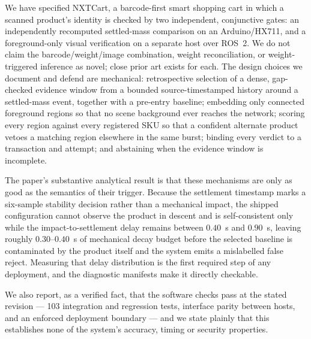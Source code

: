 \documentclass[conference]{IEEEtran}
\begin{document}
We have specified NXTCart, a barcode-first smart shopping cart in which a scanned product's identity
is checked by two independent, conjunctive gates: an independently recomputed settled-mass comparison
on an Arduino/HX711, and a foreground-only visual verification on a separate host over ROS~2. We do
not claim the barcode/weight/image combination, weight reconciliation, or weight-triggered inference
as novel; close prior art exists for each. The design choices we document and defend are mechanical:
retrospective selection of a dense, gap-checked evidence window from a bounded source-timestamped
history around a settled-mass event, together with a pre-entry baseline; embedding only connected
foreground regions so that no scene background ever reaches the network; scoring every region against
every registered SKU so that a confident alternate product vetoes a matching region elsewhere in the
same burst; binding every verdict to a transaction and attempt; and abstaining when the evidence
window is incomplete.

The paper's substantive analytical result is that these mechanisms are only as good as the semantics of
their trigger. Because the settlement timestamp marks a six-sample stability decision rather than a
mechanical impact, the shipped configuration cannot observe the product in descent and is
self-consistent only while the impact-to-settlement delay remains between $0.40$~s and $0.90$~s,
leaving roughly $0.30$--$0.40$~s of mechanical decay budget before the selected baseline is
contaminated by the product itself and the system emits a mislabelled false reject. Measuring that
delay distribution is the first required step of any deployment, and the diagnostic manifests make it
directly checkable.

We also report, as a verified fact, that the software checks pass at the stated revision --- 103
integration and regression tests, interface parity between hosts, and an enforced deployment boundary
--- and we state plainly that this establishes none of the system's accuracy, timing or security
properties.
\end{document}
